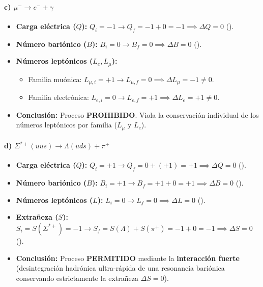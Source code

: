 \begin{problema}
\paragraph{c) $\mu^- \longrightarrow e^- + \gamma$}
\begin{itemize}
    \item \textbf{Carga eléctrica ($Q$):} $Q_i = -1 \to Q_f = -1 + 0 = -1 \implies \Delta Q = 0$ (\checkmark).
    \item \textbf{Número bariónico ($B$):} $B_i = 0 \to B_f = 0 \implies \Delta B = 0$ (\checkmark).
    \item \textbf{Números leptónicos ($L_e, L_\mu$):}
    \begin{itemize}
        \item Familia muónica: $L_{\mu,i} = +1 \to L_{\mu,f} = 0 \implies \Delta L_\mu = -1 \neq 0$.
        \item Familia electrónica: $L_{e,i} = 0 \to L_{e,f} = +1 \implies \Delta L_e = +1 \neq 0$.
    \end{itemize}
    \item \textbf{Conclusión:} Proceso \textbf{PROHIBIDO}. Viola la conservación individual de los números leptónicos por familia ($L_\mu$ y $L_e$).
\end{itemize}

\paragraph{d) $\Sigma^{*+} (uus) \longrightarrow \Lambda (uds) + \pi^+$}
\begin{itemize}
    \item \textbf{Carga eléctrica ($Q$):} $Q_i = +1 \to Q_f = 0 + (+1) = +1 \implies \Delta Q = 0$ (\checkmark).
    \item \textbf{Número bariónico ($B$):} $B_i = +1 \to B_f = +1 + 0 = +1 \implies \Delta B = 0$ (\checkmark).
    \item \textbf{Números leptónicos ($L$):} $L_i = 0 \to L_f = 0 \implies \Delta L = 0$ (\checkmark).
    \item \textbf{Extrañeza ($S$):} $S_i = S(\Sigma^{*+}) = -1 \to S_f = S(\Lambda) + S(\pi^+) = -1 + 0 = -1 \implies \Delta S = 0$ (\checkmark).
    \item \textbf{Conclusión:} Proceso \textbf{PERMITIDO} mediante la \textbf{interacción fuerte} (desintegración hadrónica ultra-rápida de una resonancia bariónica conservando estrictamente la extrañeza $\Delta S = 0$).
\end{itemize}


\end{problema}
